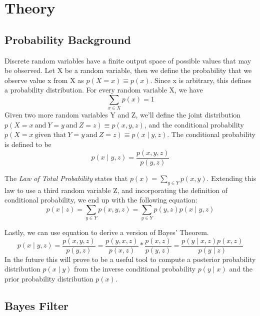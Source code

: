 \chapter{Theory}


\section{Probability Background}
Discrete random variables have a finite output space of possible values that may be observed. Let X be a random variable, then we define the probability that we observe value x from X as \( p(X = x) \equiv p(x)\). Since x is arbitrary, this defines a probability distribution. For every random variable X, we have
\begin{equation}
\sum\limits_{x \in X} p(x) = 1
\end{equation}
Given two more random variables Y and Z, we'll define the joint distribution \(p(X=x\ \textrm{and}\ Y=y\ \textrm{and}\ Z=z) \equiv p(x,y,z)\), and the conditional probability \(p(X=x\ \textrm{given that}\ Y=y\ \textrm{and}\ Z=z) \equiv p(x \mathbin{\vert} y,z)\). The conditional probability is defined to be
\begin{equation} \label{eqCondProb}
p(x \mathbin{\vert} y,z) = \frac{p(x,y,z)}{p(y,z)}
\end{equation}

The \textit{Law of Total Probability} states that \(p(x) = \sum\limits_{y \in Y} p(x,y)\). Extending this law to use a third random variable Z, and incorporating the definition of conditional probability, we end up with the following equation:
\begin{equation} \label{eqTotalProb}
p(x \mathbin{\vert} z) = \sum\limits_{y \in Y} p(x,y,z)
= \sum\limits_{y \in Y} p(y,z)p(x \mathbin{\vert} y,z)
\end{equation}

Lastly, we can use equation  to derive a version of Bayes' Theorem. 
\begin{equation} \label{eqBayesThm}
p(x \mathbin{\vert} y,z) = \frac{p(x,y,z)}{p(y,z)} = \frac{p(y,x,z)}{p(x,z)} * \frac{p(x,z)}{p(y,z)} = \frac{p(y \mathbin{\vert} x,z)p(x,z)}{p(y \mathbin{\vert} z)}
\end{equation}
In the future this will prove to be a useful tool to compute a posterior probability distribution \(p(x \mathbin{\vert} y)\) from the inverse conditional probability \(p(y \mathbin{\vert} x)\) and the prior probability distribution \(p(x)\).

\section{Bayes Filter}
